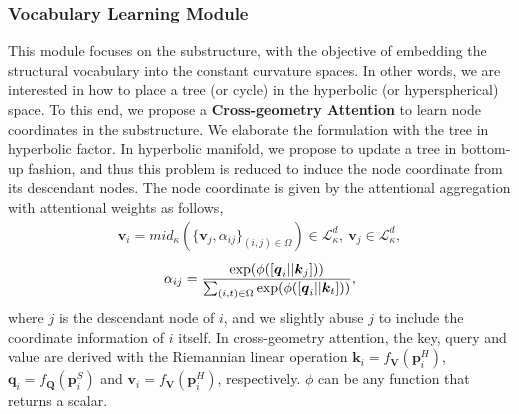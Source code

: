 \subsubsection{\textbf{Vocabulary Learning Module}}
This module focuses on the substructure, with the objective of embedding the structural vocabulary into the constant curvature spaces.
In other words, we are interested in how to place a tree (or cycle) in the hyperbolic (or hyperspherical) space. 
To this end, we propose a \textbf{Cross-geometry Attention} to learn node coordinates in the substructure.
We elaborate the formulation with the tree  in hyperbolic factor.
In hyperbolic manifold, we propose to update a tree in bottom-up fashion, and thus this problem is reduced to induce the node coordinate from its descendant nodes.
The node coordinate is given by the attentional aggregation with attentional weights as follows,
\vspace{-0.05in}
\begin{align}
    \boldsymbol v_i=mid_\kappa(\{\boldsymbol v_j, \alpha_{ij}\}_{(i,j) \in \Omega})\in \mathcal L^d_\kappa, \ \boldsymbol v_j \in \mathcal L^d_\kappa,
       \label{eq:cross-geo}
\end{align}
\vspace{-0.1in}
\begin{align}
     \alpha_{ij}=\frac{\exp(\phi([\boldsymbol q_i || \boldsymbol k_j]))}{\sum_{(i,t) \in \Omega}\exp(\phi([\boldsymbol q_i || \boldsymbol k_t]))},
     \label{eq:att}
\vspace{-0.05in}
\end{align}
where $j$ is the descendant node of $i$, and we slightly abuse $j$ to include the coordinate information of $i$ itself.
In cross-geometry attention, the key, query and value are derived with the Riemannian linear operation $\boldsymbol k_i=f_{\boldsymbol V}(\boldsymbol p^H_i)$, $\boldsymbol q_i=f_{\boldsymbol Q}(\boldsymbol p^S_i)$ and $\boldsymbol v_i=f_{\boldsymbol V}(\boldsymbol p^H_i)$, respectively.
$\phi$ can be any function that returns a scalar.
